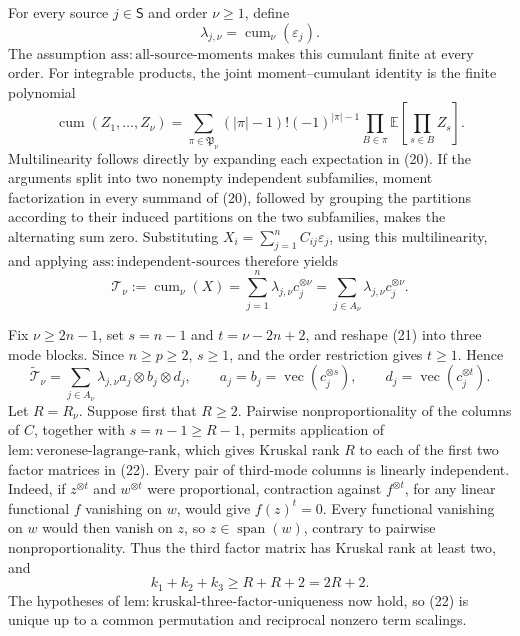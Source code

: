 For every source \(j\in\mathsf S\) and order \(\nu\ge1\), define
\[
 \lambda_{j,\nu}=\operatorname{cum}_\nu(\varepsilon_j).
\]
The assumption \(\mathrm{ass:all\text{-}source\text{-}moments}\) makes this cumulant finite at every order. For integrable products, the joint moment--cumulant identity is the finite polynomial
\[
 \operatorname{cum}(Z_1,\ldots,Z_\nu)
 =\sum_{\pi\in\mathfrak P_\nu}
 (|\pi|-1)!(-1)^{|\pi|-1}
 \prod_{B\in\pi}\mathbb E\!\left[\prod_{s\in B}Z_s\right]. \tag{20}
\]
Multilinearity follows directly by expanding each expectation in (20). If the arguments split into two nonempty independent subfamilies, moment factorization in every summand of (20), followed by grouping the partitions according to their induced partitions on the two subfamilies, makes the alternating sum zero. Substituting \(X_i=\sum_{j=1}^n C_{ij}\varepsilon_j\), using this multilinearity, and applying \(\mathrm{ass:independent\text{-}sources}\) therefore yields
\[
 \mathcal T_\nu:=\operatorname{cum}_\nu(X)
 =\sum_{j=1}^n\lambda_{j,\nu}c_j^{\otimes\nu}
 =\sum_{j\in A_\nu}\lambda_{j,\nu}c_j^{\otimes\nu}. \tag{21}
\]

Fix \(\nu\ge2n-1\), set \(s=n-1\) and \(t=\nu-2n+2\), and reshape (21) into three mode blocks. Since \(n\ge p\ge2\), \(s\ge1\), and the order restriction gives \(t\ge1\). Hence
\[
 \widetilde{\mathcal T}_\nu
 =\sum_{j\in A_\nu}\lambda_{j,\nu}a_j\otimes b_j\otimes d_j,
 \qquad
 a_j=b_j=\operatorname{vec}(c_j^{\otimes s}),
 \qquad
 d_j=\operatorname{vec}(c_j^{\otimes t}). \tag{22}
\]
Let \(R=R_\nu\). Suppose first that \(R\ge2\). Pairwise nonproportionality of the columns of \(C\), together with \(s=n-1\ge R-1\), permits application of \(\mathrm{lem:veronese\text{-}lagrange\text{-}rank}\), which gives Kruskal rank \(R\) to each of the first two factor matrices in (22). Every pair of third-mode columns is linearly independent. Indeed, if \(z^{\otimes t}\) and \(w^{\otimes t}\) were proportional, contraction against \(f^{\otimes t}\), for any linear functional \(f\) vanishing on \(w\), would give \(f(z)^t=0\). Every functional vanishing on \(w\) would then vanish on \(z\), so \(z\in\operatorname{span}(w)\), contrary to pairwise nonproportionality. Thus the third factor matrix has Kruskal rank at least two, and
\[
 k_1+k_2+k_3\ge R+R+2=2R+2. \tag{23}
\]
The hypotheses of \(\mathrm{lem:kruskal\text{-}three\text{-}factor\text{-}uniqueness}\) now hold, so (22) is unique up to a common permutation and reciprocal nonzero term scalings.

